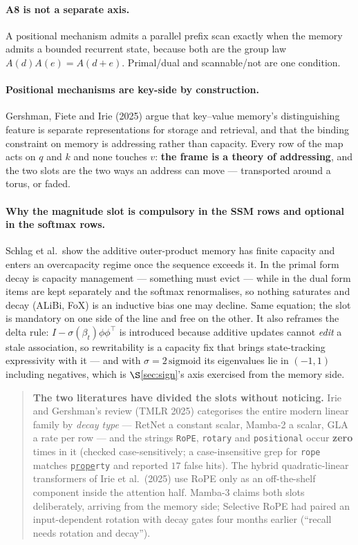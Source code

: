 \documentclass[11pt]{article}
\begin{document}
\paragraph{A8 is not a separate axis.} A positional mechanism admits a parallel prefix
scan exactly when the memory admits a bounded recurrent state, because both are the
group law $A(d)A(e)=A(d+e)$. Primal/dual and scannable/not are one condition.

\paragraph{Positional mechanisms are key-side by construction.} Gershman, Fiete and
Irie (2025) argue that key--value memory's distinguishing feature is separate
representations for storage and retrieval, and that the binding constraint on memory
is addressing rather than capacity. Every row of the map acts on $q$ and $k$ and none
touches $v$: \textbf{the frame is a theory of addressing}, and the two slots are the
two ways an address can move --- transported around a torus, or faded.

\paragraph{Why the magnitude slot is compulsory in the SSM rows and optional in the
softmax rows.} Schlag et al.\ show the additive outer-product memory has finite
capacity and enters an overcapacity regime once the sequence exceeds it. In the primal
form decay is capacity management --- something must evict --- while in the dual form
items are kept separately and the softmax renormalises, so nothing saturates and decay
(ALiBi, FoX) is an inductive bias one may decline. Same equation; the slot is
mandatory on one side of the line and free on the other. It also reframes the delta
rule: $I-\sigma(\beta_t)\phi\phi^{\!\top}$ is introduced because additive updates
cannot \emph{edit} a stale association, so rewritability is a capacity fix that brings
state-tracking expressivity with it --- and with $\sigma = 2\,\mathrm{sigmoid}$ its
eigenvalues lie in $(-1,1)$ including negatives, which is $\S$\ref{sec:sign}'s axis
exercised from the memory side.

\begin{quote}\small
\textbf{The two literatures have divided the slots without noticing.} Irie and
Gershman's review (TMLR 2025) categorises the entire modern linear family by
\emph{decay type} --- RetNet a constant scalar, Mamba-2 a scalar, GLA a rate per row
--- and the strings \texttt{RoPE}, \texttt{rotary} and \texttt{positional} occur
\textbf{zero} times in it (checked case-sensitively; a case-insensitive grep for
\texttt{rope} matches \texttt{p\underline{rope}rty} and reported $17$ false hits).
The hybrid quadratic-linear transformers of Irie et al.\ (2025) use RoPE only as an
off-the-shelf component inside the attention half. Mamba-3 claims both slots
deliberately, arriving from the memory side; Selective RoPE had paired an
input-dependent rotation with decay gates four months earlier (``recall needs
rotation and decay'').
\end{quote}
\end{document}
